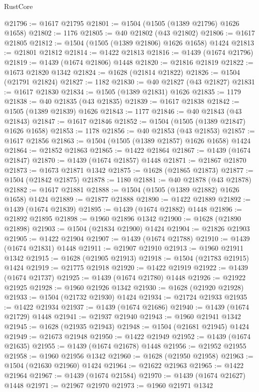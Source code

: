 \begin{lexlean}{RustCore}
\begin{coremodule}
@21796 := @1617 @21795
@21801 := @1504 (@1505 (@1389 @21796) @1626 @1658)
@21802 := 1176
@21805 := @40 @21802 (@43 @21802)
@21806 := @1617 @21805
@21812 := @1504 (@1505 (@1389 @21806) @1626 @1658) @1424
@21813 := @21801 @21812
@21814 := @1422 @21813
@21816 := @1439 (@1674 @21796)
@21819 := @1439 (@1674 @21806) @1448
@21820 := @21816 @21819
@21822 := @1673 @21820 @1342
@21824 := @1628 (@21814 @21822)
@21826 := @1504 (@21791 @21824)
@21827 := 1182
@21830 := @40 @21827 (@43 @21827)
@21831 := @1617 @21830
@21834 := @1505 (@1389 @21831) @1626
@21835 := 1179
@21838 := @40 @21835 (@43 @21835)
@21839 := @1617 @21838
@21842 := @1505 (@1389 @21839) @1626
@21843 := 1177
@21846 := @40 @21843 (@43 @21843)
@21847 := @1617 @21846
@21852 := @1504 (@1505 (@1389 @21847) @1626 @1658)
@21853 := 1178
@21856 := @40 @21853 (@43 @21853)
@21857 := @1617 @21856
@21863 := @1504 (@1505 (@1389 @21857) @1626 @1658) @1424
@21864 := @21852 @21863
@21865 := @1422 @21864
@21867 := @1439 (@1674 @21847)
@21870 := @1439 (@1674 @21857) @1448
@21871 := @21867 @21870
@21873 := @1673 @21871 @1342
@21875 := @1628 (@21865 @21873)
@21877 := @1504 (@21842 @21875)
@21878 := 1180
@21881 := @40 @21878 (@43 @21878)
@21882 := @1617 @21881
@21888 := @1504 (@1505 (@1389 @21882) @1626 @1658) @1424
@21889 := @21877 @21888
@21890 := @1422 @21889
@21892 := @1439 (@1674 @21839)
@21895 := @1439 (@1674 @21882) @1448
@21896 := @21892 @21895
@21898 := @1960 @21896 @1342
@21900 := @1628 (@21890 @21898)
@21903 := @1504 (@21834 @21900) @1424
@21904 := @21826 @21903
@21905 := @1422 @21904
@21907 := @1439 (@1674 @21788)
@21910 := @1439 (@1674 @21831) @1448
@21911 := @21907 @21910
@21913 := @1960 @21911 @1342
@21915 := @1628 (@21905 @21913)
@21918 := @1504 (@21783 @21915) @1424
@21919 := @21775 @21918
@21920 := @1422 @21919
@21922 := @1439 (@1674 @21737)
@21925 := @1439 (@1674 @21780) @1448
@21926 := @21922 @21925
@21928 := @1960 @21926 @1342
@21930 := @1628 (@21920 @21928)
@21933 := @1504 (@21732 @21930) @1424
@21934 := @21724 @21933
@21935 := @1422 @21934
@21937 := @1439 (@1674 @21686)
@21940 := @1439 (@1674 @21729) @1448
@21941 := @21937 @21940
@21943 := @1960 @21941 @1342
@21945 := @1628 (@21935 @21943)
@21948 := @1504 (@21681 @21945) @1424
@21949 := @21673 @21948
@21950 := @1422 @21949
@21952 := @1439 (@1674 @21635)
@21955 := @1439 (@1674 @21678) @1448
@21956 := @21952 @21955
@21958 := @1960 @21956 @1342
@21960 := @1628 (@21950 @21958)
@21963 := @1504 (@21630 @21960) @1424
@21964 := @21622 @21963
@21965 := @1422 @21964
@21967 := @1439 (@1674 @21584)
@21970 := @1439 (@1674 @21627) @1448
@21971 := @21967 @21970
@21973 := @1960 @21971 @1342

\end{coremodule}
\end{lexlean}
